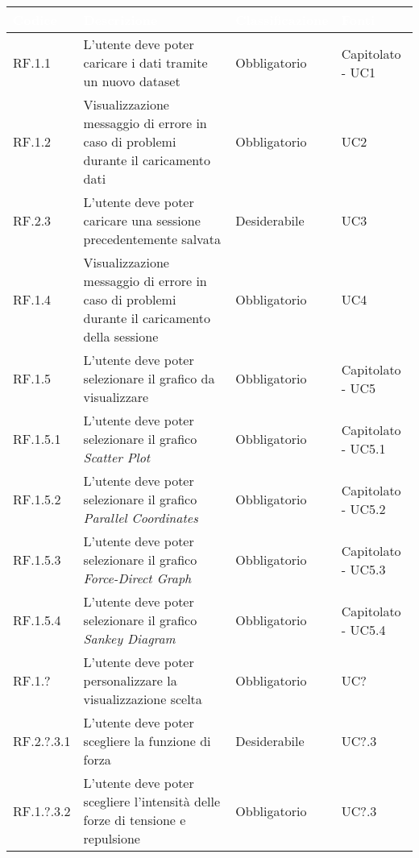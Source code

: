 \begin{center}
  \centering
  \begin{longtable}{|L{2cm}|C{5,5cm}|C{3cm}|C{2cm}|}
    \hline
    \textcolor[HTML]{FFFFFF}{\textbf{Codice}} & \textcolor[HTML]{FFFFFF}{\textbf{Descrizione}} & \textcolor[HTML]{FFFFFF}{\textbf{Classificazione}} & \textcolor[HTML]{FFFFFF}{\textbf{Fonti}}
    \\ \hline
    RF.1.1 & L'utente deve poter caricare i dati tramite un nuovo dataset & Obbligatorio & Capitolato - UC1 \\ \hline
    RF.1.2 & Visualizzazione messaggio di errore in caso di problemi durante il caricamento dati & Obbligatorio & UC2 \\ \hline
    RF.2.3 & L'utente deve poter caricare una sessione precedentemente salvata & Desiderabile & UC3 \\ \hline
    RF.1.4 & Visualizzazione messaggio di errore in caso di problemi durante il caricamento della sessione & Obbligatorio & UC4 \\ \hline
    RF.1.5 & L'utente deve poter selezionare il grafico da visualizzare & Obbligatorio & Capitolato - UC5 \\ \hline
    RF.1.5.1 & L'utente deve poter selezionare il grafico \textit{Scatter Plot} & Obbligatorio & Capitolato - UC5.1 \\ \hline
    RF.1.5.2 & L'utente deve poter selezionare il grafico \textit{Parallel Coordinates} & Obbligatorio & Capitolato - UC5.2 \\ \hline
    RF.1.5.3 & L'utente deve poter selezionare il grafico \textit{Force-Direct Graph} & Obbligatorio & Capitolato - UC5.3 \\ \hline
    RF.1.5.4 & L'utente deve poter selezionare il grafico \textit{Sankey Diagram} & Obbligatorio & Capitolato - UC5.4 \\ \hline
    RF.1.? & L'utente deve poter personalizzare la visualizzazione scelta & Obbligatorio & UC? \\ \hline
    RF.2.?.3.1 & L'utente deve poter scegliere la funzione di forza & Desiderabile & UC?.3 \\ \hline
    RF.1.?.3.2 & L'utente deve poter scegliere l'intensità delle forze di tensione e repulsione & Obbligatorio & UC?.3 \\ \hline

\end{longtable}
\end{center}
